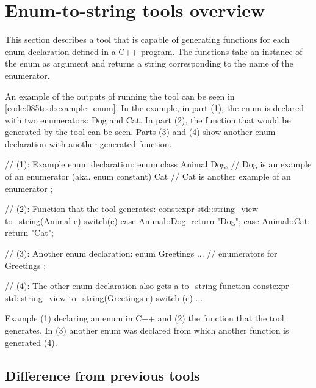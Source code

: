 \pagebreak
\section{Enum-to-string tools overview}
This section describes a tool that is capable of generating  functions for each enum declaration defined in a C++ program. The  functions take an instance of the enum as argument and returns a string corresponding to the name of the enumerator.

An example of the outputs of running the tool can be seen in \cref{code:085tool:example_enum}. In the example, in part (1), the enum  is declared with two enumerators: Dog and Cat. In part (2), the  function that would be generated by the tool can be seen. Parts (3) and (4) show another enum declaration with another generated  function.

\begin{listing}[H]
    \begin{cppcode}
// (1): Example enum declaration:
enum class Animal{
    Dog, // Dog is an example of an enumerator (aka. enum constant)
    Cat // Cat is another example of an enumerator
};


// (2): Function that the tool generates:
constexpr std::string_view to_string(Animal e){
    switch(e) {
        case Animal::Dog: return "Dog";
        case Animal::Cat: return "Cat";
    }
}

// (3): Another enum declaration:
enum Greetings {
    ... // enumerators for Greetings
};

// (4): The other enum declaration also gets a to_string function
constexpr std::string_view to_string(Greetings e){
    switch (e) {
        ... 
    }
}
    \end{cppcode}
    \caption{Example (1) declaring an enum in C++ and (2) the  function that the tool generates. In (3) another enum was declared from which another  function is generated (4).}
    \label{code:085tool:example_enum}
\end{listing}

\subsection{Difference from previous tools}

